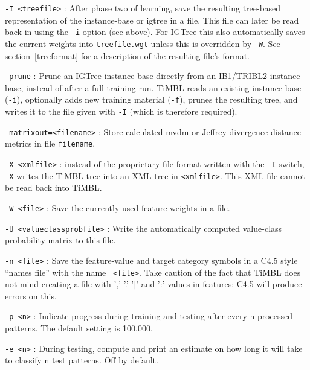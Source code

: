 \documentclass{book}
\begin{document}
\begin{description}

\item {\tt -I <treefile>} : After phase two of learning, save
  the resulting tree-based representation of the instance-base or {\sc
    igtree} in a file. This file can later be read back in using the
  {\tt -i} option (see above). For {\sc IGTree} this also automatically
  saves the current weights into {\tt treefile.wgt} unless this is
  overridden by {\tt -W}.
  See section~\ref{treeformat} for a description of the resulting file's format.

\item {\tt --prune} : Prune an {\sc IGTree} instance base directly from
  an IB1/TRIBL2 instance base, instead of after a full training run.
  TiMBL reads an existing instance base ({\tt -i}), optionally adds new
  training material ({\tt -f}), prunes the resulting tree, and writes
  it to the file given with {\tt -I} (which is therefore required).

\item {\tt --matrixout=<filename>} : Store calculated {\sc mvdm} or
  Jeffrey divergence distance metrics in file {\tt filename}.

\item {\tt -X <xmlfile>} : instead of the proprietary file format
  written with the {\tt -I} switch, {\tt -X} writes the TiMBL tree
  into an XML tree in {\tt <xmlfile>}. This XML file cannot be read
  back into TiMBL.

\item {\tt -W <file>} : Save the currently used feature-weights in a
file.

\item {\tt -U <valueclassprobfile>} : Write the automatically computed
value-class probability matrix to this file.

\item {\tt -n <file>} : Save the feature-value and target category
symbols in a C4.5 style ``names file'' with the name {\tt
<file>}. Take caution of the fact that TiMBL does not mind creating a
file with ',' '.' '$|$' and ':' values in features; C4.5 will produce errors on this.

\item {\tt -p <n>} : Indicate progress during training and testing
after every n processed patterns. The default setting is 100,000.

\item {\tt -e <n>} : During testing, compute and print an estimate on
how long it will take to classify n test patterns. Off by
default.


\end{description}
\end{document}
